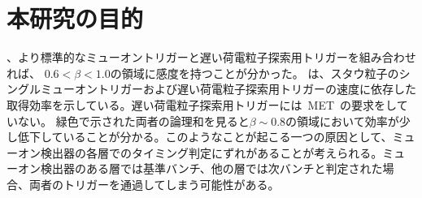 \section{本研究の目的}
、より標準的なミューオントリガーと遅い荷電粒子探索用トリガーを組み合わせれば、
$0.6 < \beta < 1.0$の領域に感度を持つことが分かった。
は、スタウ粒子のシングルミューオントリガーおよび遅い荷電粒子探索用トリガーの速度に依存した取得効率を示している。遅い荷電粒子探索用トリガーには~MET~の要求をしていない。
緑色で示された両者の論理和を見ると$\beta\sim0.8$の領域において効率が少し低下していることが分かる。このようなことが起こる一つの原因として、ミューオン検出器の各層でのタイミング判定にずれがあることが考えられる。ミューオン検出器のある層では基準バンチ、他の層では次バンチと判定された場合、両者のトリガーを通過してしまう可能性がある。

